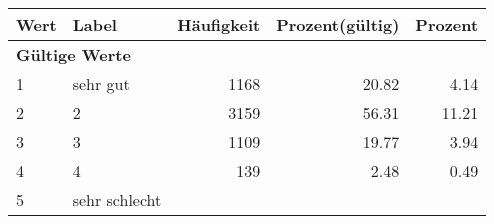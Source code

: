      \begin{longtable}{lXrrr}
     \toprule
     \textbf{Wert} & \textbf{Label} & \textbf{Häufigkeit} & \textbf{Prozent(gültig)} & \textbf{Prozent} \\
     \endhead
     \midrule
     \multicolumn{5}{l}{\textbf{Gültige Werte}}\\

     1 &
     \multicolumn{1}{X}{ sehr gut   } &


       \num{1168} &
       \num[round-mode=places,round-precision=2]{20.82} &
         \num[round-mode=places,round-precision=2]{4.14} \\

     2 &
     \multicolumn{1}{X}{ 2   } &


       \num{3159} &
       \num[round-mode=places,round-precision=2]{56.31} &
         \num[round-mode=places,round-precision=2]{11.21} \\

     3 &
     \multicolumn{1}{X}{ 3   } &


       \num{1109} &
       \num[round-mode=places,round-precision=2]{19.77} &
         \num[round-mode=places,round-precision=2]{3.94} \\

     4 &
     \multicolumn{1}{X}{ 4   } &


       \num{139} &
       \num[round-mode=places,round-precision=2]{2.48} &
         \num[round-mode=places,round-precision=2]{0.49} \\

     5 &
     \multicolumn{1}{X}{ sehr schlecht   } &



\end{longtable}

